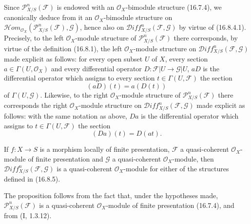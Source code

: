 \begin{env}[16.8.5]
\label{IV.16.8.5}
Since $\mathscr{P}_{X/S}^n(\mathscr{F})$ is endowed with an
$\mathcal{O}_X$-bimodule structure (16.7.4), we canonically deduce from it an
$\mathcal{O}_X$-bimodule structure on
$\mathscr{H}\!om_{\mathcal{O}_X}
(\mathscr{P}_{X/S}^n(\mathscr{F}),\mathscr{G})$, hence also on
$\mathscr{D}\!iff_{X/S}^n(\mathscr{F},\mathscr{G})$ by virtue of (16.8.4.1).
Precisely, to the left $\mathcal{O}_X$-module structure of
$\mathscr{P}_{X/S}^n(\mathscr{F})$ there corresponds, by virtue of the
definition (16.8.1), the left $\mathcal{O}_X$-module structure on
$\mathscr{D}\!iff_{X/S}^n(\mathscr{F},\mathscr{G})$ made explicit as follows:
for every open subset $U$ of $X$, every section
$a\in\Gamma(U,\mathcal{O}_X)$ and every differential operator
$D:\mathscr{F}|U\to\mathscr{G}|U$, $aD$ is the differential operator which
assigns to every section $t\in\Gamma(U,\mathscr{F})$ the section
\[
  (aD)(t)=a(D(t))
  \tag{16.8.5.1}
  \label{IV.16.8.5.1}
\]
of $\Gamma(U,\mathscr{G})$. Likewise, to the right
$\mathcal{O}_X$-module structure of $\mathscr{P}_{X/S}^n(\mathscr{F})$
there corresponds the right $\mathcal{O}_X$-module structure on
$\mathscr{D}\!iff_{X/S}^n(\mathscr{F},\mathscr{G})$ made explicit as follows:
with the same notation as above, $Da$ is the differential operator which
assigns to $t\in\Gamma(U,\mathscr{F})$ the section
\[
  (Da)(t)=D(at).
  \tag{16.8.5.2}
  \label{IV.16.8.5.2}
\]
\end{env}

\begin{proposition}[16.8.6]
\label{IV.16.8.6}
If $f:X\to S$ is a morphism locally of finite presentation,
$\mathscr{F}$ a quasi-coherent $\mathcal{O}_X$-module of finite presentation
and $\mathscr{G}$ a quasi-coherent $\mathcal{O}_X$-module, then
$\mathscr{D}\!iff_{X/S}^n(\mathscr{F},\mathscr{G})$ is a quasi-coherent
$\mathcal{O}_X$-module for either of the structures defined
in (16.8.5).
\end{proposition}

The proposition follows from the fact that, under the hypotheses made,
$\mathscr{P}_{X/S}^n(\mathscr{F})$ is a quasi-coherent $\mathcal{O}_X$-module
of finite presentation (16.7.4), and from (I, 1.3.12).

